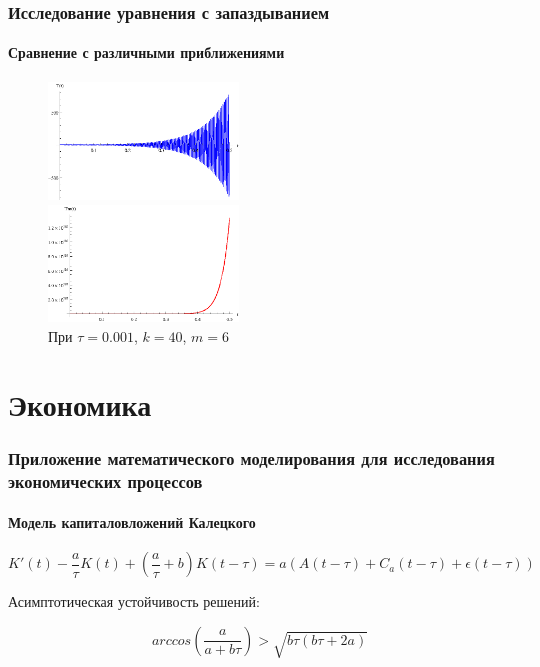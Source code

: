 \documentclass{beamer}
\numberwithin{equation}{section}
\begin{document}
    \begin{frame}
        \frametitle{Исследование уравнения с запаздыванием}
        \framesubtitle{Сравнение с различными приближениями}

        \begin{figure}[h]
        \begin{center}
            \includegraphics[width=0.45\textwidth]{not_applicable_init.eps}
        \end{center}
        \begin{center}
            \includegraphics[width=0.45\textwidth]{not_applicable_m.eps}
        \end{center}
        \caption{При $\tau=0.001$, $k=40$, $m=6$}
        \end{figure}

    \end{frame}

    \section{Экономика}

     \begin{frame}
        \frametitle{Приложение математического моделирования для исследования экономических процессов}
        \framesubtitle{Модель капиталовложений Калецкого}

        \begin{equation}
            K'(t) - \dfrac{a}{\tau} K(t) + \left( \dfrac{a}{\tau} + b \right) K(t-\tau) = a (A(t-\tau) + C_a(t-\tau) + \epsilon(t-\tau))
        \end{equation}

        Асимптотическая устойчивость решений:

        \begin{equation}
            arccos \left( \frac{a}{a + b \tau} \right) > \sqrt{b \tau (b \tau + 2a)}
        \end{equation}

    \end{frame}
\end{document}
